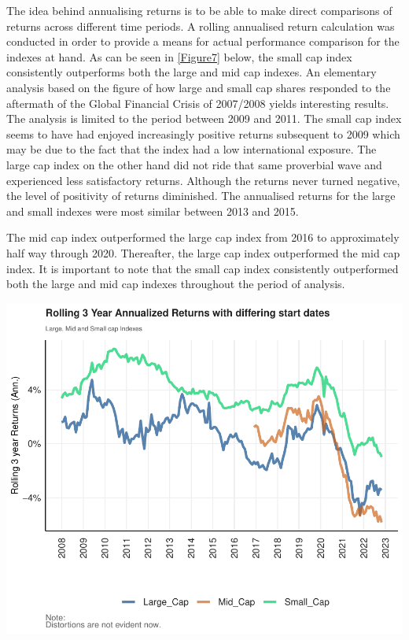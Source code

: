\documentclass[11pt,preprint, authoryear]{elsarticle}
\let\origfigure\figure
\let\endorigfigure\endfigure
\renewenvironment{figure}[1][2] {
    \expandafter\origfigure\expandafter[H]
} {
    \endorigfigure
}
\numberwithin{equation}{section}
\numberwithin{figure}{section}
\numberwithin{table}{section}
\begin{document}
The idea behind annualising returns is to be able to make direct
comparisons of returns across different time periods. A rolling
annualised return calculation was conducted in order to provide a means
for actual performance comparison for the indexes at hand. As can be
seen in \ref{Figure7} below, the small cap index consistently
outperforms both the large and mid cap indexes. An elementary analysis
based on the figure of how large and small cap shares responded to the
aftermath of the Global Financial Crisis of 2007/2008 yields interesting
results. The analysis is limited to the period between 2009 and 2011.
The small cap index seems to have had enjoyed increasingly positive
returns subsequent to 2009 which may be due to the fact that the index
had a low international exposure. The large cap index on the other hand
did not ride that same proverbial wave and experienced less satisfactory
returns. Although the returns never turned negative, the level of
positivity of returns diminished. The annualised returns for the large
and small indexes were most similar between 2013 and 2015.

The mid cap index outperformed the large cap index from 2016 to
approximately half way through 2020. Thereafter, the large cap index
outperformed the mid cap index. It is important to note that the small
cap index consistently outperformed both the large and mid cap indexes
throughout the period of analysis.

\begin{figure}[H]

{\centering \includegraphics{Volatility-of-Shares_files/figure-latex/Figure7-1} 

}

\caption{Rolling Annualised Returns of the Indexes \label{Figure7}}\label{fig:Figure7}
\end{figure}
\end{document}
